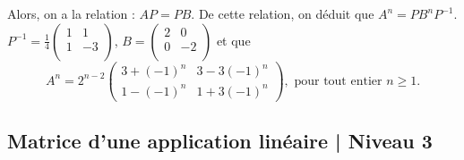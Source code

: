\begin{question}
\begin{explanations}
Alors, on a la relation : $AP=PB$. De cette relation, on déduit que $A^n=PB^nP^{-1}$. $P^{-1}= \frac{1}{4}\left(\begin{array}{rc}
1&1\\ 1&-3\\ \end{array}\right)$,  $B= \left(\begin{array}{rc}
2&0\\0&-2\\ \end{array}\right)$ et que
$$A^n= 2^{n-2}\left(\begin{array}{rc}3+(-1)^n&3-3(-1)^n\\
1-(-1)^n &1+3(-1)^n\end{array}\right),\mbox{  pour tout entier }n\ge1.$$
\end{explanations}
\end{question}

\subsection{Matrice d'une application linéaire | Niveau 3}


